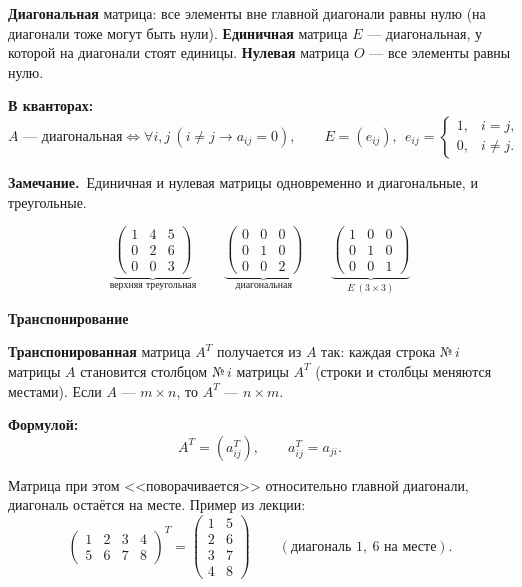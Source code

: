 \documentclass[a4paper,11pt]{article}
\newcommand{\kv}{\par\noindent\textbf{\textcolor{oprc!85!black}{В кванторах:}}}
\newcommand{\fm}{\par\noindent\textbf{\textcolor{oprc!85!black}{Формулой:}}}
\newcommand{\zam}{\par\smallskip\noindent\textbf{\textcolor{zamc}{Замечание.}}\ }
\newcommand{\podr}[1]{\par\needspace{8\baselineskip}\medskip
  {\large\bfseries\textcolor{oprc!80!black}{#1}}\par\nopagebreak\smallskip}
\begin{document}
\begin{opr}
\textbf{Диагональная} матрица: все элементы вне главной диагонали равны нулю (на диагонали тоже могут быть нули).
\textbf{Единичная} матрица $E$ --- диагональная, у которой на диагонали стоят единицы.
\textbf{Нулевая} матрица $O$ --- все элементы равны нулю.
\kv
\[
  A \text{ --- диагональная} \Leftrightarrow \forall i, j\ (i \ne j \to a_{ij} = 0), \qquad
  E = (e_{ij}),\ \ e_{ij} = \begin{cases} 1, & i = j, \\ 0, & i \ne j. \end{cases}
\]
\end{opr}

\zam Единичная и нулевая матрицы одновременно и диагональные, и треугольные.

\[
  \underbrace{\begin{pmatrix} 1 & 4 & 5 \\ 0 & 2 & 6 \\ 0 & 0 & 3 \end{pmatrix}}_{\text{верхняя треугольная}}
  \qquad
  \underbrace{\begin{pmatrix} 0 & 0 & 0 \\ 0 & 1 & 0 \\ 0 & 0 & 2 \end{pmatrix}}_{\text{диагональная}}
  \qquad
  \underbrace{\begin{pmatrix} 1 & 0 & 0 \\ 0 & 1 & 0 \\ 0 & 0 & 1 \end{pmatrix}}_{E \ (3 \times 3)}
\]

\podr{Транспонирование}

\begin{opr}[транспонирование]
\textbf{Транспонированная} матрица $A^T$ получается из $A$ так: каждая строка $\text{№}\,i$ матрицы $A$ становится
столбцом $\text{№}\,i$ матрицы $A^T$ (строки и столбцы меняются местами). Если $A$ --- $m \times n$, то $A^T$ --- $n \times m$.
\fm
\[
  A^T = (a^T_{ij}), \qquad a^T_{ij} = a_{ji}.
\]
\end{opr}

Матрица при этом <<поворачивается>> относительно главной диагонали, диагональ остаётся на месте. Пример из лекции:
\[
  \begin{pmatrix} 1 & 2 & 3 & 4 \\ 5 & 6 & 7 & 8 \end{pmatrix}^{T} = \begin{pmatrix} 1 & 5 \\ 2 & 6 \\ 3 & 7 \\ 4 & 8 \end{pmatrix}
  \qquad (\text{диагональ } 1,\ 6 \text{ на месте}).
\]
\end{document}
